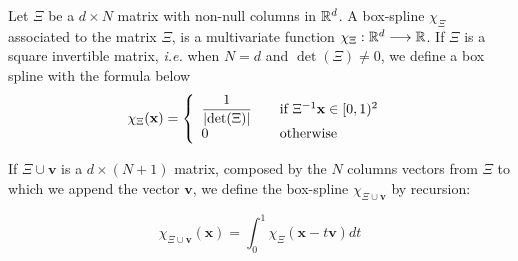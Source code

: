 \documentclass[proc]{edpsmath}
\begin{document}
\begin{dfntn}

	Let $\Xi$ be a $d \times N$ matrix with non-null columns in  $\mathbb{R}^d$. A box-spline $\chi_\Xi$ associated to the matrix $\Xi$, is a multivariate function $\chi_\Xi : \mathbb{R}^d \longrightarrow \mathbb{R}$. If $\Xi$ is a square invertible matrix, \emph{i.e.} when $N = d$ and $\det(\Xi) \neq 0$, we define a box spline with the formula below
	\begin{equation}
		\chi_{\Xi} (\mathbf{x}) = \left\{
  		\begin{array}{l l}
    		\dfrac{1}{\lvert \det(\Xi)\rvert} & \quad \text{if $\Xi^{-1}\mathbf{x} \in [0,1)^2$ }\\
    		0 & \quad \text{otherwise}
  		\end{array} \right.
	\end{equation}

	If $\Xi \cup \mathbf{v}$ is a $d \times (N + 1)$ matrix, composed by the $N$ columns vectors from $\Xi$ to which we append the vector $\mathbf{v}$, we define the box-spline $\chi_{\Xi \cup \mathbf{v}}$ by recursion:

	\begin{equation} 
	\label{eqn:boxsplines_basis}
		\chi_{\Xi \cup \mathbf{v}}(\mathbf{x}) = \int_0^ 1 \chi_\Xi(\mathbf{x}-t\mathbf{v})dt
	\end{equation}

\end{dfntn}
\end{document}
